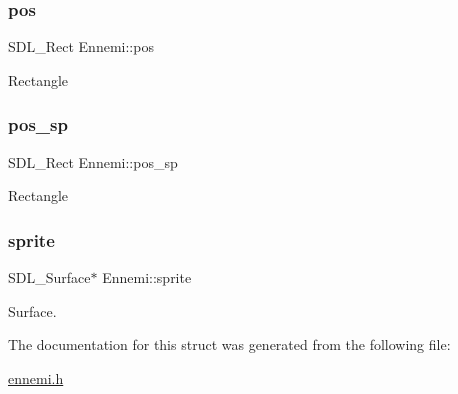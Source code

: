 \subsubsection{\texorpdfstring{pos}{pos}}
{\footnotesize\ttfamily S\+D\+L\+\_\+\+Rect Ennemi\+::pos}

Rectangle \mbox{\label{structEnnemi_a51c0688f2281052086eb3092cb8ff485}} 
\subsubsection{\texorpdfstring{pos\+\_\+sp}{pos\_sp}}
{\footnotesize\ttfamily S\+D\+L\+\_\+\+Rect Ennemi\+::pos\+\_\+sp}

Rectangle \mbox{\label{structEnnemi_adb0efeb167c3a5c5981ec5ef704ee94b}} 
\subsubsection{\texorpdfstring{sprite}{sprite}}
{\footnotesize\ttfamily S\+D\+L\+\_\+\+Surface$\ast$ Ennemi\+::sprite}

Surface. 

The documentation for this struct was generated from the following file\+:\begin{DoxyCompactItemize}
\item 
\hyperlink{ennemi_8h}{ennemi.\+h}\end{DoxyCompactItemize}
